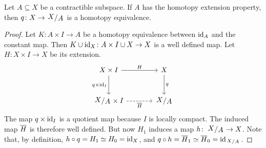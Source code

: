 \begin{trditev}
Let $A \subseteq X$ be a contractible subspace. If $A$ has the
homotopy extension property, then $q \colon X \to \kvoc{X}{A}$ is a
homotopy equivalence.
\end{trditev}

\begin{proof}
Let $K \colon A \times I \to A$ be a homotopy equivalence between
$\operatorname{id}_A$ and the constant map. Then
$K \cup \operatorname{id}_X \colon A \times I \cup X \to X$ is a well defined
map. Let $H \colon X \times I \to X$ be its extension.
\[
\begin{tikzcd}[column sep=large, row sep=large]
X \times I \arrow[r, "H"] \arrow[d, "q \times \id_I"'] &
X \arrow[d, "q"] \\
\kvoc{X}{A} \times I \arrow[r, dashed, "\oline{H}"']
&
\kvoc{X}{A}
\end{tikzcd}
\]
The map $q \times \operatorname{id}_I$ is a quotient map because $I$ is locally
compact. The induced map $\overline{H}$ is therefore well defined.
But now $H_1$ induces a map $h \colon \kvoc{X}{A} \to X$. Note
that, by definition, $h \circ q = H_1 \simeq H_0 = \operatorname{id}_X$, and
$q \circ h = \oline{H}_1 \simeq \oline{H}_0 = \id_{\kvoc{X}{A}}$.
\end{proof}
